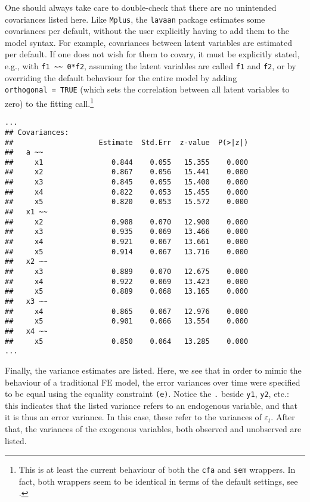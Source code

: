 \documentclass[]{interact}
\theoremstyle{plain}%
\theoremstyle{definition}
\theoremstyle{remark}
\begin{document}
One should always take care to double-check that there are no unintended
covariances listed here. Like \texttt{Mplus}, the \texttt{lavaan}
package estimates some covariances per default, without the user
explicitly having to add them to the model syntax. For example,
covariances between latent variables are estimated per default. If one
does not wish for them to covary, it must be explicitly stated, e.g.,
with \texttt{f1\ \textasciitilde{}\textasciitilde{}\ 0*f2}, assuming the
latent variables are called \texttt{f1} and \texttt{f2}, or by
overriding the default behaviour for the entire model by adding
\texttt{orthogonal\ =\ TRUE} (which sets the correlation between all
latent variables to zero) to the fitting call.\footnote{This is at least
  the current behaviour of both the \texttt{cfa} and \texttt{sem}
  wrappers. In fact, both wrappers seem to be identical in terms of the
  default settings, see \citet{Rosseel2020}.}

\singlespacing

\begin{verbatim}
...
## Covariances:
##                    Estimate  Std.Err  z-value  P(>|z|)
##   a ~~                                                
##     x1                0.844    0.055   15.355    0.000
##     x2                0.867    0.056   15.441    0.000
##     x3                0.845    0.055   15.400    0.000
##     x4                0.822    0.053   15.455    0.000
##     x5                0.820    0.053   15.572    0.000
##   x1 ~~                                               
##     x2                0.908    0.070   12.900    0.000
##     x3                0.935    0.069   13.466    0.000
##     x4                0.921    0.067   13.661    0.000
##     x5                0.914    0.067   13.716    0.000
##   x2 ~~                                               
##     x3                0.889    0.070   12.675    0.000
##     x4                0.922    0.069   13.423    0.000
##     x5                0.889    0.068   13.165    0.000
##   x3 ~~                                               
##     x4                0.865    0.067   12.976    0.000
##     x5                0.901    0.066   13.554    0.000
##   x4 ~~                                               
##     x5                0.850    0.064   13.285    0.000
...
\end{verbatim}

\doublespacing

Finally, the variance estimates are listed. Here, we see that in order
to mimic the behaviour of a traditional FE model, the error variances
over time were specified to be equal using the equality constraint
\texttt{(e)}. Notice the \texttt{.} beside \texttt{y1}, \texttt{y2},
etc.: this indicates that the listed variance refers to an endogenous
variable, and that it is thus an error variance. In this case, these
refer to the variances of \(\varepsilon_{t}\). After that, the variances
of the exogenous variables, both observed and unobserved are listed.
\end{document}
